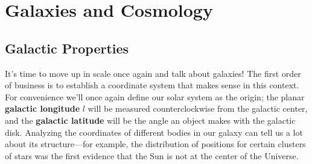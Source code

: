 \documentclass[../a062main.tex]{subfiles}
\begin{document}
\chapter{Galaxies and Cosmology}
\section{Galactic Properties}
It's time to move up in scale once again and talk about galaxies!
The first order of business is to establish a coordinate system that makes sense in this context.
For convenience we'll once again define our solar system as the origin; the planar \textbf{galactic longitude} $l$ will be measured counterclockwise from the galactic center, and the \textbf{galactic latitude} will be the angle an object makes with the galactic disk.
Analyzing the coordinates of different bodies in our galaxy can tell us a lot about its structure---for example, the distribution of positions for certain clusters of stars was the first evidence that the Sun is not at the center of the Universe.
\end{document}
